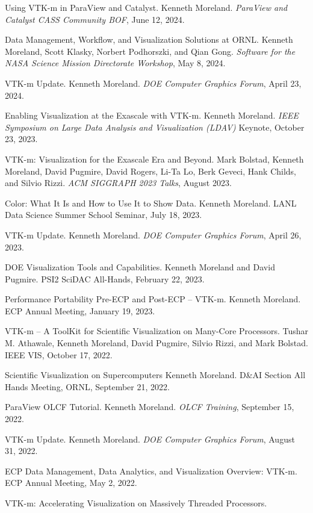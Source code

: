 \documentclass{article}
\begin{document}
\begin{enumerate}[label={[\arabic*]}]
\item Using VTK-m in ParaView and Catalyst.
  Kenneth Moreland.
  \emph{ParaView and Catalyst CASS Community BOF}, June 12, 2024.
\item Data Management, Workflow, and Visualization Solutions at ORNL.
  Kenneth Moreland, Scott Klasky, Norbert Podhorszki, and Qian Gong.
  \emph{Software for the NASA Science Mission Directorate Workshop}, May 8, 2024.
\item VTK-m Update.
  Kenneth Moreland.
  \emph{DOE Computer Graphics Forum}, April 23, 2024.
\item Enabling Visualization at the Exascale with VTK-m.
  Kenneth Moreland.
  \emph{IEEE Symposium on Large Data Analysis and Visualization (LDAV)} Keynote,
  October 23, 2023.
\item VTK-m: Visualization for the Exascale Era and Beyond.
  Mark Bolstad, Kenneth Moreland, David Pugmire, David Rogers, Li-Ta Lo, Berk Geveci, Hank Childs, and Silvio Rizzi.
  \emph{ACM SIGGRAPH 2023 Talks}, August 2023.
\item Color: What It Is and How to Use It to Show Data.
  Kenneth Moreland.
  LANL Data Science Summer School Seminar, July 18, 2023.
\item VTK-m Update.
  Kenneth Moreland.
  \emph{DOE Computer Graphics Forum}, April 26, 2023.
\item DOE Visualization Tools and Capabilities.
  Kenneth Moreland and David Pugmire.
  PSI2 SciDAC All-Hands, February 22, 2023.
\item Performance Portability Pre-ECP and Post-ECP -- VTK-m.
  Kenneth Moreland.
  ECP Annual Meeting, January 19, 2023.
\item VTK-m -- A ToolKit for Scientific Visualization on Many-Core Processors.
  Tushar M. Athawale, Kenneth Moreland, David Pugmire, Silvio Rizzi, and Mark Bolstad.
  IEEE VIS, October 17, 2022.
\item Scientific Visualization on Supercomputers
  Kenneth Moreland.
  D\&AI Section All Hands Meeting, ORNL, September 21, 2022.
\item ParaView OLCF Tutorial.
  Kenneth Moreland.
  \emph{OLCF Training}, September 15, 2022.
\item VTK-m Update.
  Kenneth Moreland.
  \emph{DOE Computer Graphics Forum}, August 31, 2022.
\item ECP Data Management, Data Analytics, and Visualization Overview: VTK-m.
  ECP Annual Meeting, May 2, 2022.
\item VTK-m: Accelerating Visualization on Massively Threaded Processors.

\end{enumerate}
\end{document}
